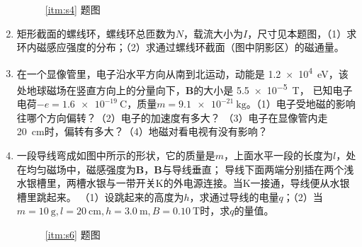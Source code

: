 \documentclass[UTF-8]{ctexart}
\newcommand{\csi}[2]{ \SI{#1}{#2}}
\begin{document}
\begin{enumerate}
\begin{figure}[htb]
\begin{minipage}[b]{0.4\textwidth}
                \caption{\ref{itm:s4} 题图}
            \end{minipage}
        \end{figure}

    \item \label{itm:s4} 矩形截面的螺线环，螺线环总匝数为\(N\)，载流大小为\(I\)，尺寸见本题图，（1）求环内磁感应强度的分布；（2）求通过螺线环截面（图中阴影区）的磁通量。 

    \item 在一个显像管里，电子沿水平方向从南到北运动，动能是\csi{1.2e4}{\eV}，该处地球磁场在竖直方向上的分量向下，\(\bm{B}\)的大小是\csi{5.5e-5}{\tesla}，
        已知电子电荷\(-e=\csi{1.6e-19}{\coulomb}\)，质量\(m=\csi{9.1e-21}{\kg}\)。（1）电子受地磁的影响往哪个方向偏转？（2）电子的加速度有多大？
        （3）电子在显像管内走\csi{20}{\cm}时，偏转有多大？（4）地磁对看电视有没有影响？

    \item \label{itm:s6} 一段导线弯成如图中所示的形状，它的质量是\(m\)，上面水平一段的长度为\(l\)，处在均匀磁场中，磁感强度为\(\bm{B}\)，\(\bm{B}\)与导线垂直；
        导线下面两端分别插在两个浅水银槽里，两槽水银与一带开关K的外电源连接。当K一接通，导线便从水银槽里跳起来。
        （1）设跳起来的高度为\(h\)，求通过导线的电量\(q\)；（2）当\(m=\csi{10}{\g},l=\csi{20}{\cm},h=\csi{3.0}{\m},B=\csi{0.10}{\tesla}\)时，求\(q\)的量值。
        \begin{figure}[htb]
            \centering
            \begin{minipage}[b]{0.4\textwidth}
                \begin{tikzpicture}
                \end{tikzpicture}
                \caption{\ref{itm:s6} 题图}
            \end{minipage}
        \end{figure}


\end{enumerate}
\end{document}
